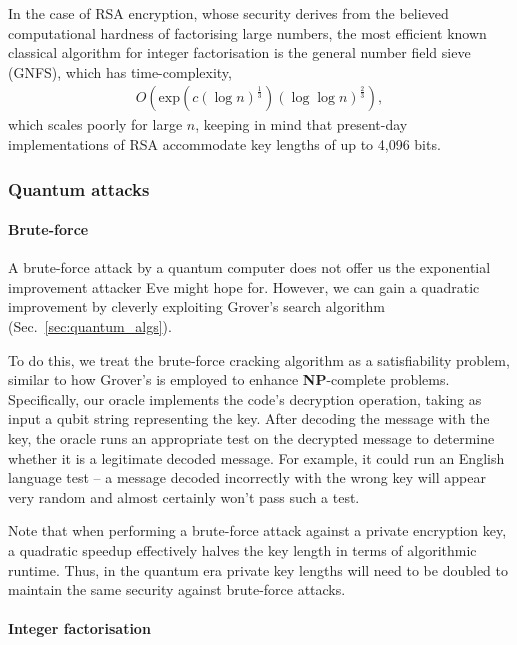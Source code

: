 In the case of RSA encryption, whose security derives from the believed computational hardness of factorising large numbers, the most efficient known classical algorithm for integer factorisation is the general number field sieve (GNFS), which has time-complexity,
\begin{align}
	O(\mathrm{exp}(c (\log n)^{\frac{1}{3}}) (\log\log n)^{\frac{2}{3}}),
\end{align}
which scales poorly for large $n$, keeping in mind that present-day implementations of RSA accommodate key lengths of up to 4,096 bits. 

\subsubsection{Quantum attacks}

\paragraph{Brute-force}

A brute-force attack by a quantum computer does not offer us the exponential improvement attacker Eve might hope for. However, we can gain a quadratic improvement by cleverly exploiting Grover's search algorithm (Sec.~\ref{sec:quantum_algs}).

To do this, we treat the brute-force cracking algorithm as a satisfiability problem, similar to how Grover's is employed to enhance \textbf{NP}-complete problems. Specifically, our oracle implements the code's decryption operation, taking as input a qubit string representing the key. After decoding the message with the key, the oracle runs an appropriate test on the decrypted message to determine whether it is a legitimate decoded message. For example, it could run an English language test -- a message decoded incorrectly with the wrong key will appear very random and almost certainly won't pass such a test.

Note that when performing a brute-force attack against a private encryption key, a quadratic speedup effectively halves the key length in terms of algorithmic runtime. Thus, in the quantum era private key lengths will need to be doubled to maintain the same security against brute-force attacks.

\paragraph{Integer factorisation}

